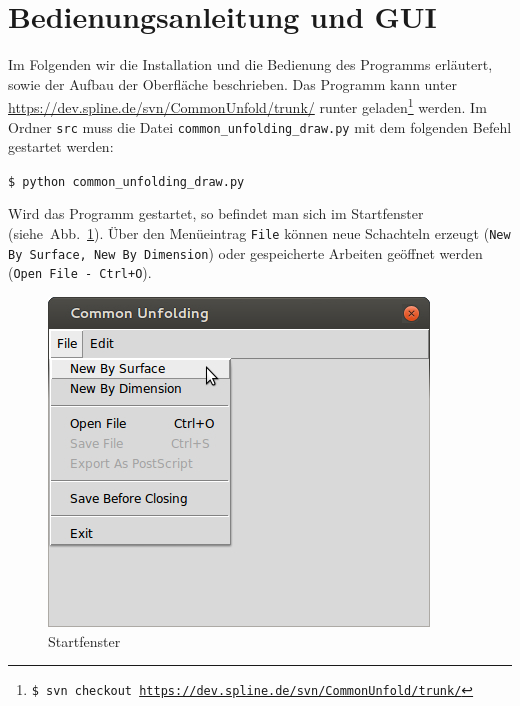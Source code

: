 \section{Bedienungsanleitung und GUI}
\label{sec:frontend}

Im Folgenden wir die Installation und die Bedienung des Programms erläutert, sowie der Aufbau der Oberfläche beschrieben. Das Programm kann unter \url{https://dev.spline.de/svn/CommonUnfold/trunk/} runter geladen\footnote{\texttt{\$ svn checkout \url{https://dev.spline.de/svn/CommonUnfold/trunk/}}} werden. Im Ordner \texttt{src} muss die Datei \texttt{common\_unfolding\_draw.py} mit dem folgenden Befehl gestartet werden:\\

\centerline{\texttt{\$ python common\_unfolding\_draw.py\\[2ex]}}


Wird das Programm gestartet, so befindet man sich im Startfenster (siehe~Abb.~\ref{fig:startFenster}). Über den Menüeintrag \texttt{File} können neue Schachteln erzeugt (\texttt{New By Surface, New By Dimension}) oder gespeicherte Arbeiten geöffnet werden (\texttt{Open File - Ctrl+O}).

\begin{figure}[htbp]
  \centering
  \includegraphics[scale=0.5]{03_pics/start.jpg}
  \caption{Startfenster}
  \label{fig:startFenster}
\end{figure}


